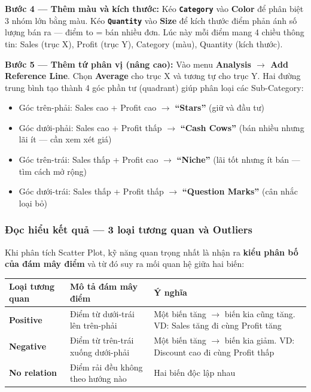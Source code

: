 \documentclass[12pt]{article}
\begin{document}
\noindent \textbf{Bước 4 --- Thêm màu và kích thước:} Kéo \textbf{\texttt{Category}} vào \textbf{Color} để phân biệt 3 nhóm lớn bằng màu. Kéo \textbf{\texttt{Quantity}} vào \textbf{Size} để kích thước điểm phản ánh số lượng bán ra --- điểm to = bán nhiều đơn. Lúc này mỗi điểm mang 4 chiều thông tin: Sales (trục X), Profit (trục Y), Category (màu), Quantity (kích thước).

\noindent \textbf{Bước 5 --- Thêm tứ phân vị (nâng cao):} Vào menu \textbf{Analysis $\rightarrow$ Add Reference Line}. Chọn \textbf{Average} cho trục X và tương tự cho trục Y. Hai đường trung bình tạo thành 4 góc phần tư (quadrant) giúp phân loại các Sub-Category:
\begin{itemize}[nosep]
    \item Góc trên-phải: Sales cao + Profit cao $\rightarrow$ \textbf{``Stars''} (giữ và đầu tư)
    \item Góc dưới-phải: Sales cao + Profit thấp $\rightarrow$ \textbf{``Cash Cows''} (bán nhiều nhưng lãi ít --- cần xem xét giá)
    \item Góc trên-trái: Sales thấp + Profit cao $\rightarrow$ \textbf{``Niche''} (lãi tốt nhưng ít bán --- tìm cách mở rộng)
    \item Góc dưới-trái: Sales thấp + Profit thấp $\rightarrow$ \textbf{``Question Marks''} (cân nhắc loại bỏ)
\end{itemize}

\subsubsection{Đọc hiểu kết quả --- 3 loại tương quan và Outliers}

\noindent Khi phân tích Scatter Plot, kỹ năng quan trọng nhất là nhận ra \textbf{kiểu phân bố của đám mây điểm} và từ đó suy ra mối quan hệ giữa hai biến:

\begin{center}
\renewcommand{\arraystretch}{1.4}
\begin{tabularx}{\linewidth}{>{\raggedright\arraybackslash}p{3cm} X X}
\toprule
\textbf{Loại tương quan} & \textbf{Mô tả đám mây điểm} & \textbf{Ý nghĩa} \\
\midrule
\textbf{Positive} & Điểm từ dưới-trái lên trên-phải & Một biến tăng $\rightarrow$ biến kia cũng tăng. VD: Sales tăng đi cùng Profit tăng \\
\textbf{Negative} & Điểm từ trên-trái xuống dưới-phải & Một biến tăng $\rightarrow$ biến kia giảm. VD: Discount cao đi cùng Profit thấp \\
\textbf{No relation} & Điểm rải đều không theo hướng nào & Hai biến độc lập nhau \\
\bottomrule
\end{tabularx}
\end{center}
\end{document}

